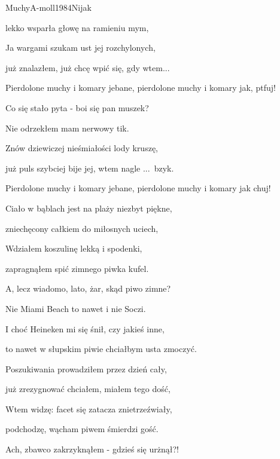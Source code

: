 \begin{song}{Muchy}{A-moll}{1984}{Nijak}{}{}
\begin{SBVerse}
    lekko wsparła głowę na ramieniu mym,

    Ja wargami szukam ust jej rozchylonych,

    już znalazłem, już chcę wpić się, gdy wtem...
  \end{SBVerse}

  \begin{SBChorus}
    Pierdolone muchy i komary jebane, pierdolone muchy i komary jak, ptfuj!
  \end{SBChorus}

  \begin{SBVerse}
    Co się stało pyta - boi się pan muszek?

    Nie odrzekłem mam nerwowy tik.

    Znów dziewiczej nieśmiałości lody kruszę,

    już puls szybciej bije jej, wtem nagle ...~bzyk.
  \end{SBVerse}

  \begin{SBChorus}
    Pierdolone muchy i komary jebane, pierdolone muchy i komary jak chuj!
  \end{SBChorus}

  \begin{SBVerse}
    Ciało w bąblach jest na plaży niezbyt piękne,

    zniechęcony całkiem do miłosnych uciech,

    Wdziałem koszulinę lekką i spodenki,

    zapragnąłem spić zimnego piwka kufel.
  \end{SBVerse}
  \begin{SBVerse}
    A, lecz wiadomo, lato, żar, skąd piwo zimne?

    Nie Miami Beach to nawet i nie Soczi.

    I choć Heineken mi się śnił, czy jakieś inne,

    to nawet w słupskim piwie chciałbym usta zmoczyć.
  \end{SBVerse}
  \begin{SBVerse}
    Poszukiwania prowadziłem przez dzień cały,

    już zrezygnować chciałem, miałem tego dość,

    Wtem widzę: facet się zatacza znietrzeźwiały,

    podchodzę, wącham piwem śmierdzi gość.
  \end{SBVerse}
  \begin{SBVerse}
    Ach, zbawco zakrzyknąłem - gdzieś się urżnął?!


\end{SBVerse}
\end{song}
